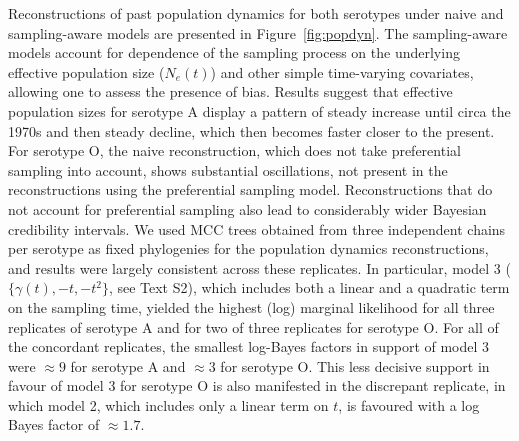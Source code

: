 \documentclass[10pt]{article}
\begin{document}
Reconstructions of past population dynamics for both serotypes under naive and sampling-aware models are presented in Figure~\ref{fig:popdyn}.
The sampling-aware models account for dependence of the sampling process on the underlying effective population size ($N_e(t)$) and other simple time-varying covariates, allowing one to assess the presence of bias.
Results suggest that effective population sizes for serotype A display a pattern of steady increase until circa the 1970s and then steady decline, which then becomes faster closer to the present.
For serotype O, the naive reconstruction, which does not take preferential sampling into account, shows substantial oscillations, not present in the reconstructions using %
the preferential sampling model.
Reconstructions that do not account for preferential sampling also lead to considerably wider Bayesian credibility intervals.
We used MCC trees obtained from three independent chains per serotype as fixed phylogenies for the population dynamics reconstructions, and results were largely consistent across these replicates. %
In particular, model 3 ($\{\gamma(t), -t, -t^2\}$, see Text S2), which includes both a linear and a quadratic term on the sampling time, yielded the highest (log) marginal likelihood for all three replicates of serotype A and for two of three replicates for serotype O. %
For all of the concordant replicates, the smallest log-Bayes factors in support of model 3 were $\approx 9$ for serotype A and $\approx 3$ for serotype O.
This less decisive support in favour of model 3 for serotype O is also manifested in the discrepant replicate, in which model 2, which includes only a linear term on $t$, is favoured with a log Bayes factor of $\approx 1.7$. %
\end{document}
